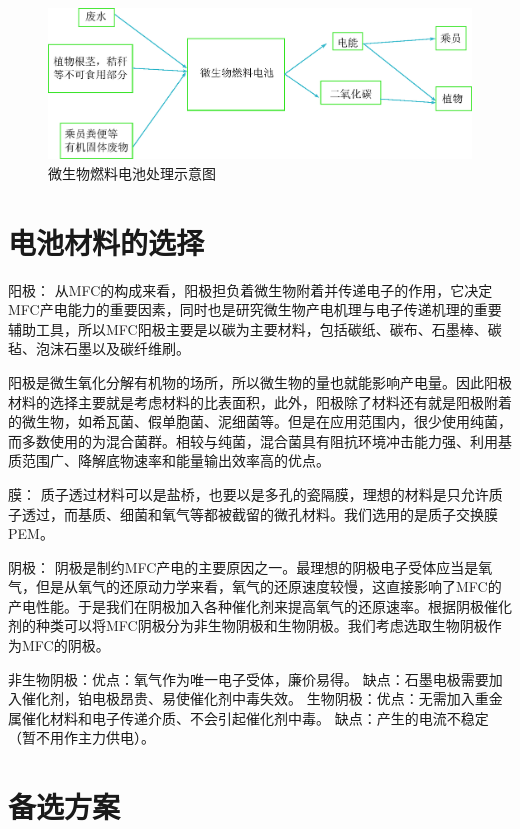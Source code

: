 \begin{figure}[H]
  \centering
  \includegraphics[width=\textwidth]{figure/recycling.eps}
  \caption{微生物燃料电池处理示意图}
\end{figure}

\section{电池材料的选择}

阳极：
从MFC的构成来看，阳极担负着微生物附着并传递电子的作用，它决定MFC产电能力的重要因素，同时也是研究微生物产电机理与电子传递机理的重要辅助工具，所以MFC阳极主要是以碳为主要材料，包括碳纸、碳布、石墨棒、碳毡、泡沫石墨以及碳纤维刷。

阳极是微生氧化分解有机物的场所，所以微生物的量也就能影响产电量。因此阳极材料的选择主要就是考虑材料的比表面积，此外，阳极除了材料还有就是阳极附着的微生物，如希瓦菌、假单胞菌、泥细菌等。但是在应用范围内，很少使用纯菌，而多数使用的为混合菌群。相较与纯菌，混合菌具有阻抗环境冲击能力强、利用基质范围广、降解底物速率和能量输出效率高的优点。

膜：
质子透过材料可以是盐桥，也要以是多孔的瓷隔膜，理想的材料是只允许质子透过，而基质、细菌和氧气等都被截留的微孔材料。我们选用的是质子交换膜PEM。

阴极：
阴极是制约MFC产电的主要原因之一。最理想的阴极电子受体应当是氧气，但是从氧气的还原动力学来看，氧气的还原速度较慢，这直接影响了MFC的产电性能。于是我们在阴极加入各种催化剂来提高氧气的还原速率。根据阴极催化剂的种类可以将MFC阴极分为非生物阴极和生物阴极。我们考虑选取生物阴极作为MFC的阴极。

非生物阴极：优点：氧气作为唯一电子受体，廉价易得。
缺点：石墨电极需要加入催化剂，铂电极昂贵、易使催化剂中毒失效。
生物阴极：优点：无需加入重金属催化材料和电子传递介质、不会引起催化剂中毒。
缺点：产生的电流不稳定（暂不用作主力供电）。

\section{备选方案}

